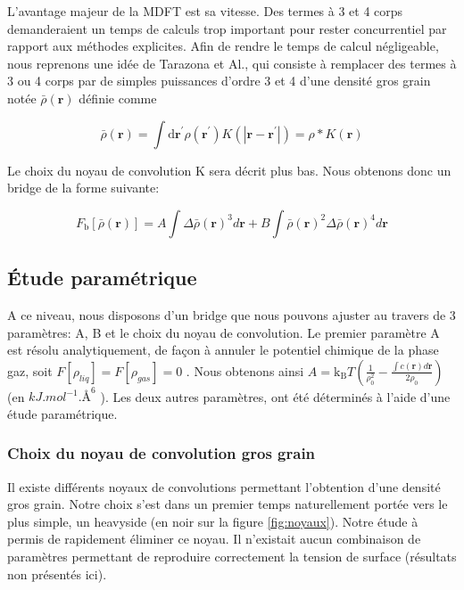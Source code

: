 L'avantage majeur de la MDFT est sa vitesse. Des termes à 3 et 4 corps demanderaient un temps de calculs trop important pour rester concurrentiel par rapport aux méthodes explicites. Afin de rendre le temps de calcul négligeable, nous reprenons une idée de Tarazona et Al.\cite{tarazona_free-energy_1985}, qui consiste à remplacer des termes à 3 ou 4 corps par de simples puissances d'ordre 3 et 4 d'une densité gros grain notée $\bar{\rho}(\boldsymbol{r})$ définie comme

\begin{equation} \label{eq:convolution_gros_grain}
\bar{\rho}(\boldsymbol{r}) = \int \mathrm{d}\boldsymbol{r}^\prime \rho(\boldsymbol{r}^\prime) K\left(\left|\boldsymbol{r}-\boldsymbol{r}^\prime\right|\right) = \rho\ast K \left( \boldsymbol{r} \right)
\end{equation}

Le choix du noyau de convolution K sera décrit plus bas. Nous obtenons donc un bridge de la forme suivante:

\begin{equation} \label{eq:fbridge_2}
F_{\mathrm{b}}[\bar{\rho}(\boldsymbol{r})]=A\int\Delta\bar{\rho}(\boldsymbol{r})^3d\boldsymbol{r}+B\int\bar{\rho}(\boldsymbol{r})^2\Delta\bar{\rho}(\boldsymbol{r})^4d\boldsymbol{r}
\end{equation} 


\subsection{\'Etude paramétrique}
A ce niveau, nous disposons d'un bridge que nous pouvons ajuster au travers de 3 paramètres: A, B et le choix du noyau de convolution. Le premier paramètre A est résolu analytiquement, de façon à annuler le potentiel chimique de la phase gaz, soit $F[\rho_{liq}]=F[\rho_{gas}]=0$ . Nous obtenons ainsi $A=\mathrm{k_B}T(\frac{1}{\rho_0^2} - \frac{\int c(\boldsymbol{r}) d\boldsymbol{r}}{2\rho_0})$ (en $kJ.mol^{-1}.\text{\AA}^{6}$ ). Les deux autres paramètres, ont été déterminés à l'aide d'une étude paramétrique.

\subsubsection{Choix du noyau de convolution gros grain}
Il existe différents noyaux de convolutions permettant l'obtention d'une densité gros grain. Notre choix s'est dans un premier temps naturellement portée vers le plus simple, un heavyside (en noir sur la figure \ref{fig:noyaux}). Notre étude à permis de rapidement éliminer ce noyau. Il n'existait aucun combinaison de paramètres permettant de reproduire correctement la tension de surface (résultats non présentés ici). 











